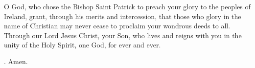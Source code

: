 \lettrine[lines=3]{O}{} God, who chose the Bishop Saint Patrick
to preach your glory to the peoples of Ireland,
grant, through his merits and intercession,
that those who glory in the name of Christian
may never cease to proclaim your wondrous deeds to all.
Through our Lord Jesus Christ, your Son,
who lives and reigns with you in the unity of the Holy Spirit,
one God, for ever and ever. \par \Rbar. Amen.